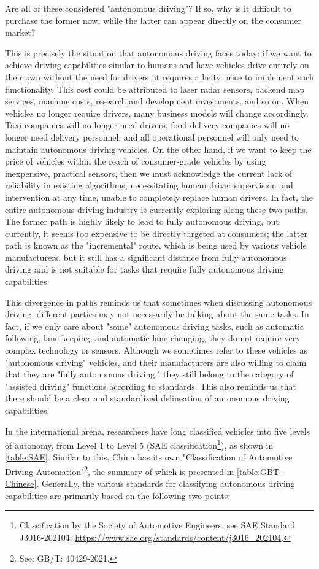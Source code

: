 Are all of these considered "autonomous driving"? If so, why is it difficult to purchase the former now, while the latter can appear directly on the consumer market?

This is precisely the situation that autonomous driving faces today: if we want to achieve driving capabilities similar to humans and have vehicles drive entirely on their own without the need for drivers, it requires a hefty price to implement such functionality. This cost could be attributed to laser radar sensors, backend map services, machine costs, research and development investments, and so on. When vehicles no longer require drivers, many business models will change accordingly. Taxi companies will no longer need drivers, food delivery companies will no longer need delivery personnel, and all operational personnel will only need to maintain autonomous driving vehicles. On the other hand, if we want to keep the price of vehicles within the reach of consumer-grade vehicles by using inexpensive, practical sensors, then we must acknowledge the current lack of reliability in existing algorithms, necessitating human driver supervision and intervention at any time, unable to completely replace human drivers. In fact, the entire autonomous driving industry is currently exploring along these two paths. The former path is highly likely to lead to fully autonomous driving, but currently, it seems too expensive to be directly targeted at consumers; the latter path is known as the "incremental" route, which is being used by various vehicle manufacturers, but it still has a significant distance from fully autonomous driving and is not suitable for tasks that require fully autonomous driving capabilities.

This divergence in paths reminds us that sometimes when discussing autonomous driving, different parties may not necessarily be talking about the same tasks. In fact, if we only care about "some" autonomous driving tasks, such as automatic following, lane keeping, and automatic lane changing, they do not require very complex technology or sensors. Although we sometimes refer to these vehicles as "autonomous driving" vehicles, and their manufacturers are also willing to claim that they are "fully autonomous driving," they still belong to the category of "assisted driving" functions according to standards. This also reminds us that there should be a clear and standardized delineation of autonomous driving capabilities.

In the international arena, researchers have long classified vehicles into five levels of autonomy, from Level 1 to Level 5 (SAE classification\footnote{Classification by the Society of Automotive Engineers, see SAE Standard J3016-202104: \url{https://www.sae.org/standards/content/j3016_202104}.}), as shown in \autoref{table:SAE}. Similar to this, China has its own "Classification of Automotive Driving Automation"\footnote{See: GB/T: 40429-2021.}, the summary of which is presented in \ref{table:GBT-Chinese}. Generally, the various standards for classifying autonomous driving capabilities are primarily based on the following two points:

